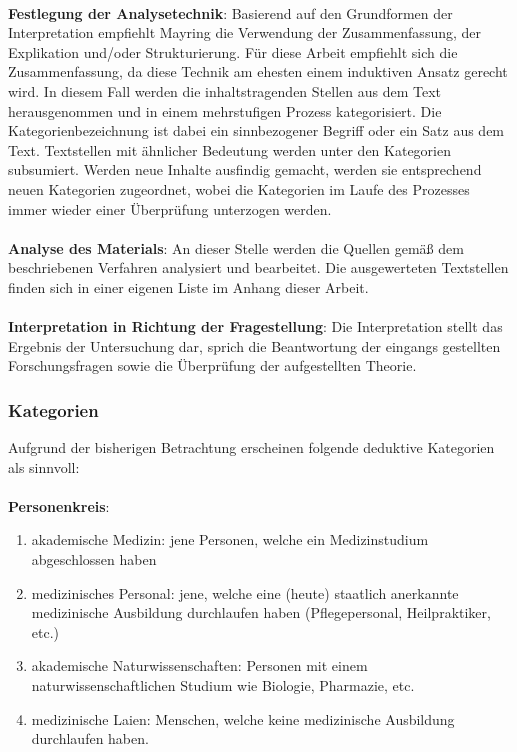 \documentclass[
    a4paper,
    12pt,
    hyphens,
    chapterprefix=true,
    headheight=33pt,
    footheight=29pt,
    headings=optiontohead,
]{scrartcl}
\begin{document}
\\
\textbf{Festlegung der Analysetechnik}: Basierend auf den Grundformen der Interpretation empfiehlt Mayring die Verwendung der Zusammenfassung, der Explikation und/oder Strukturierung. Für diese Arbeit empfiehlt sich die Zusammenfassung, da diese Technik am ehesten einem induktiven Ansatz gerecht wird. In diesem Fall werden die inhaltstragenden Stellen aus dem Text herausgenommen und in einem mehrstufigen Prozess kategorisiert. Die Kategorienbezeichnung ist dabei ein sinnbezogener Begriff oder ein Satz aus dem Text. Textstellen mit ähnlicher Bedeutung werden unter den Kategorien subsumiert. Werden neue Inhalte ausfindig gemacht, werden sie entsprechend neuen Kategorien zugeordnet, wobei die Kategorien im Laufe des Prozesses immer wieder einer Überprüfung unterzogen werden.\\
\\
\textbf{Analyse des Materials}: An dieser Stelle werden die Quellen gemäß dem beschriebenen Verfahren analysiert und bearbeitet. Die ausgewerteten Textstellen finden sich in einer eigenen Liste im Anhang dieser Arbeit.\\
\\
\textbf{Interpretation in Richtung der Fragestellung}: Die Interpretation stellt das Ergebnis der Untersuchung dar, sprich die Beantwortung der eingangs gestellten Forschungsfragen sowie die Überprüfung der aufgestellten Theorie.

\subsubsection{Kategorien}
Aufgrund der bisherigen Betrachtung erscheinen folgende deduktive Kategorien als sinnvoll:\\
\\
\textbf{Personenkreis}:
\begin{enumerate}
    \item{akademische Medizin: jene Personen, welche ein Medizinstudium abgeschlossen haben}
  \item{medizinisches Personal: jene, welche eine (heute) staatlich anerkannte medizinische Ausbildung durchlaufen haben (Pflegepersonal, Heilpraktiker, etc.)}
  \item{akademische Naturwissenschaften: Personen mit einem naturwissenschaftlichen Studium wie Biologie, Pharmazie, etc.}
  \item{medizinische Laien: Menschen, welche keine medizinische Ausbildung durchlaufen haben.}
\end{enumerate}
\end{document}

